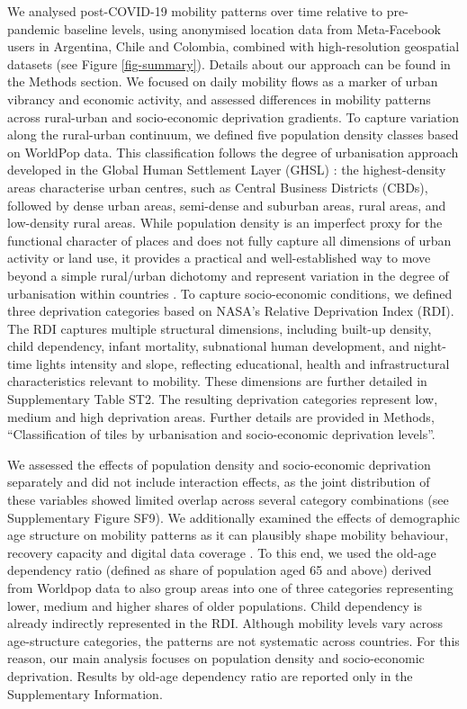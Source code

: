 \documentclass[fleqn,10pt]{wlscirep}
\begin{document}
We analysed post-COVID-19 mobility patterns over time relative to pre-pandemic baseline levels, using anonymised location data from Meta-Facebook users in Argentina, Chile and Colombia, combined with high-resolution geospatial datasets (see Figure \ref{fig-summary}). Details about our approach can be found in the Methods section. We focused on daily mobility flows as a marker of urban vibrancy and economic activity, and assessed differences in mobility patterns across rural-urban and socio-economic deprivation gradients. To capture variation along the rural-urban continuum, we defined five population density classes based on WorldPop data. This classification follows the degree of urbanisation approach developed in the Global Human Settlement Layer (GHSL) \cite{pesaresi2016ghsl}: the highest-density areas characterise urban centres, such as Central Business Districts (CBDs), followed by dense urban areas, semi-dense and suburban areas, rural areas, and low-density rural areas. While population density is an imperfect proxy for the functional character of places and does not fully capture all dimensions of urban activity or land use, it provides a practical and well-established way to move beyond a simple rural/urban dichotomy and represent variation in the degree of urbanisation within countries \cite{championhugo2004, rees1999internal, rees2017impact, UNpopulation25, GHSL19}. To capture socio-economic conditions, we defined three deprivation categories based on NASA’s Relative Deprivation Index (RDI). The RDI captures multiple structural dimensions, including built-up density, child dependency, infant mortality, subnational human development, and night-time lights intensity and slope, reflecting educational, health and infrastructural characteristics relevant to mobility. These dimensions are further detailed in Supplementary Table ST2. The resulting deprivation categories represent low, medium and high deprivation areas. Further details are provided in Methods, ``Classification of tiles by urbanisation and socio-economic deprivation levels''.

We assessed the effects of population density and socio-economic deprivation separately and did not include interaction effects, as the joint distribution of these variables showed limited overlap across several category combinations (see Supplementary Figure SF9). We additionally examined the effects of demographic age structure on mobility patterns as it can plausibly shape mobility behaviour, recovery capacity and digital data coverage \cite{cabrera2025bias}. To this end, we used the old-age dependency ratio (defined as share of population aged 65 and above) derived from Worldpop data to also group areas into one of three categories representing lower, medium and higher shares of older populations. Child dependency is already indirectly represented in the RDI. Although mobility levels vary across age-structure categories, the patterns are not systematic across countries. For this reason, our main analysis focuses on population density and socio-economic deprivation. Results by old-age dependency ratio are reported only in the Supplementary Information.
\end{document}
